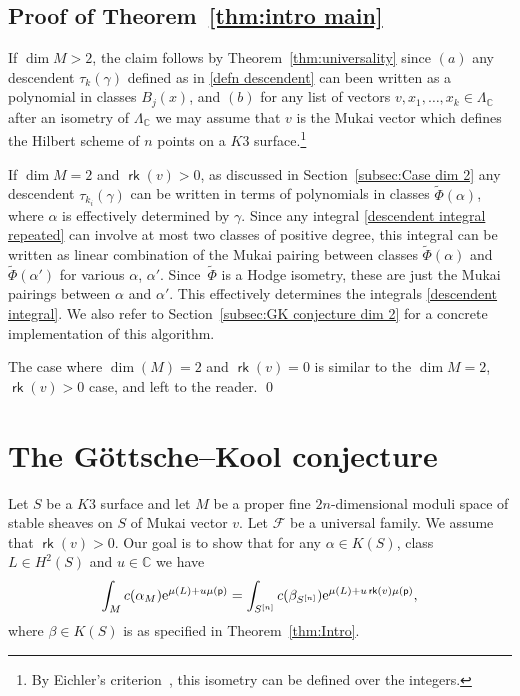 \documentclass[pdftex]{sigma}
\numberwithin{equation}{section}
\newcommand{\BC}{{\mathbb{C}}}
\newcommand{\CF}{{\mathcal F}}
\newcommand{\pt}{{\mathsf{p}}}
\newcommand{\1}{\mathsf{1}}
\newcommand\rk{\operatorname{\mathsf{rk}}}
\begin{document}
\subsection{Proof of Theorem~\ref{thm:intro main}}

If $\dim M > 2$, the claim follows by Theorem~\ref{thm:universality} since
$(a)$ any descendent $\tau_k(\gamma)$ defined as in \eqref{defn descendent}
can been written as a polynomial in classes $B_j(x)$,
and $(b)$ for any list of vectors $v, x_1, \dots, x_k \in \Lambda_{\BC}$
after an isometry of $\Lambda_{\BC}$ we may assume that $v$ is the Mukai vector which defines the Hilbert scheme of $n$ points on a $K3$ surface.\footnote{By Eichler's criterion~\cite[Lemma~7.5]{GHS}, this isometry can be defined over the integers.}

If $\dim M = 2$ and $\rk(v) > 0$, as discussed in Section~\ref{subsec:Case dim 2} any descendent $\tau_{k_i}(\gamma)$
can be written in terms of polynomials in classes $\widetilde{\Phi}(\alpha)$, where $\alpha$ is effectively determined by $\gamma$.
Since any integral \eqref{descendent integral repeated} can involve
at most two classes of positive degree, this integral can be written
as linear combination of the Mukai pairing between classes $\widetilde{\Phi}(\alpha)$ and $\widetilde{\Phi}(\alpha')$ for various $\alpha$, $\alpha'$.
Since~$\widetilde{\Phi}$ is a Hodge isometry, these are just the Mukai pairings between $\alpha$ and $\alpha'$.
This effectively determines the integrals \eqref{descendent integral}.
We also refer to Section~\ref{subsec:GK conjecture dim 2} for a concrete implementation of this algorithm.

The case where $\dim(M) = 2$ and $\rk(v) = 0$ is similar to the $\dim M = 2$, $\rk(v)>0$ case, and left to the reader.
\qed




\section{The G\"ottsche--Kool conjecture} \label{GK conjecture}

Let $S$ be a $K3$ surface and let $M$ be a proper fine $2n$-dimensional moduli space of stable sheaves on $S$ of Mukai vector $v$. Let $\CF$ be a universal family. We assume that $\rk(v) > 0$.
Our goal is to show that
for any $\alpha \in K(S)$,
class $L \in H^2(S)$ and $u \in \BC$ we have
\begin{equation*}
\int_{M} c(\alpha_M) {\rm e}^{\mu(L) + u \mu(\pt)}
=\int_{S^{[n]}} c(\beta_{S^{[n]}}) {\rm e}^{\mu(L) + u \rk(v) \mu(\pt)},
\end{equation*}
where $\beta \in K(S)$ is as specified in Theorem~\ref{thm:Intro}.
\end{document}
